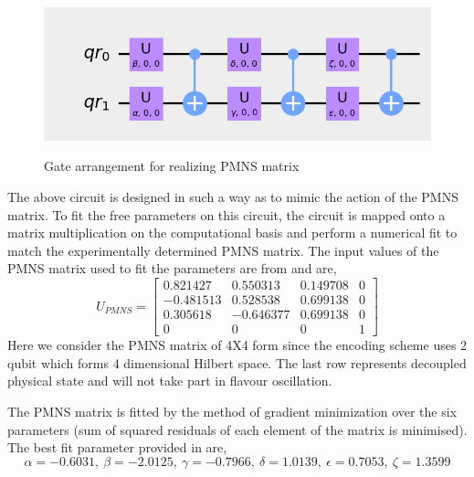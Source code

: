 \documentclass[12pt,a4paper]{report}
\begin{document}
\begin{figure}[h]
\graphicspath{ {./Images/} }
\centering	
{\includegraphics[scale=1]{fig_3.png}}
\caption{Gate arrangement for realizing PMNS matrix\cite{jones}}
\label{fig 3}
\end{figure}

The above circuit is designed in such a way as to mimic the action of the PMNS matrix. To fit the free parameters on this circuit, the circuit is mapped onto a matrix multiplication on the computational basis and perform a numerical fit to match the experimentally determined PMNS matrix. The input values of the PMNS matrix used to fit the parameters are from \cite{estaban} and are,
\begin{equation}
U_{PMNS} = \begin{bmatrix} 0.821427 & 0.550313 & 0.149708 & 0 \\ -0.481513&0.528538&0.699138&0\\0.305618&-0.646377&0.699138&0\\0&0&0&1 \end{bmatrix}
\end{equation}
Here we consider the PMNS matrix of 4X4 form since the encoding scheme uses 2 qubit which forms 4 dimensional Hilbert space.  The last row represents decoupled physical state and will not take part in flavour oscillation. \par
The PMNS matrix is fitted by the method of gradient minimization over the six parameters (sum of squared residuals of each element of the matrix is minimised). The best fit parameter provided in \cite{jones} are, 
\begin{equation}
\label{eq:18}
\alpha = -0.6031,\ \beta = -2.0125, \ \gamma = -0.7966, \ \delta = 1.0139 ,\  \epsilon = 0.7053, \ \zeta = 1.3599
\end{equation}
\end{document}

